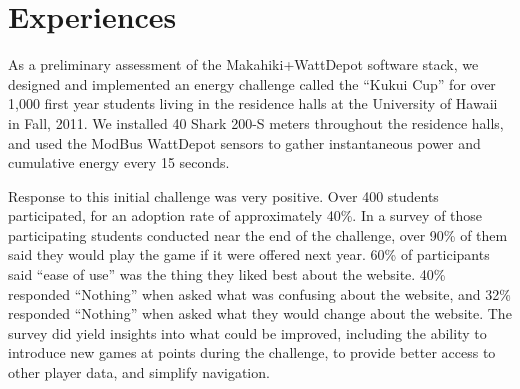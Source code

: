 \section{Experiences}

As a preliminary assessment of the Makahiki+WattDepot software stack, we designed and implemented an energy challenge called the ``Ku\-kui Cup'' for over 1,000 first year students living in the residence halls at the University of Hawaii in Fall, 2011.  We installed 40 Shark 200-S meters throughout the residence halls, and used the ModBus WattDepot sensors to gather instantaneous power and cumulative energy every 15 seconds. 

Response to this initial challenge was very positive.   Over 400 students participated, for an adoption rate of approximately 40\%.  In a survey of those participating students conducted near the end of the challenge, over 90\% of them said they would play the game if it were offered next year.  60\% of participants said ``ease of use'' was the thing they liked best about the website.  40\% responded ``Nothing'' when asked what was confusing about the website, and 32\% responded ``Nothing'' when asked what they would change about the website.  The survey did yield insights into what could be improved, including the ability to introduce new games at points during the challenge, to provide better access to other player data, and simplify navigation.


